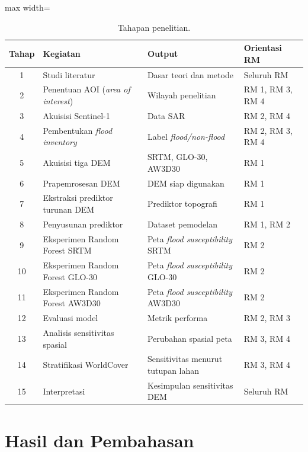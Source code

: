 \documentclass[12pt]{article}
\begin{document}
\begin{table}[ht]
\centering
\caption{Tahapan penelitian.}
\label{tab:tahapan}
\begin{adjustbox}{max width=\textwidth}
\begin{tabular}{clp{5.4cm}p{4.6cm}}
\toprule
\textbf{Tahap} & \textbf{Kegiatan} & \textbf{Output} & \textbf{Orientasi RM} \\
\midrule
1 & Studi literatur & Dasar teori dan metode & Seluruh RM \\
2 & Penentuan AOI (\textit{area of interest}) & Wilayah penelitian & RM 1, RM 3, RM 4 \\
3 & Akuisisi Sentinel-1 & Data SAR & RM 2, RM 4 \\
4 & Pembentukan \textit{flood inventory} & Label \textit{flood/non-flood} & RM 2, RM 3, RM 4 \\
5 & Akuisisi tiga DEM & SRTM, GLO-30, AW3D30 & RM 1 \\
6 & Prapemrosesan DEM & DEM siap digunakan & RM 1 \\
7 & Ekstraksi prediktor turunan DEM & Prediktor topografi & RM 1 \\
8 & Penyusunan prediktor & Dataset pemodelan & RM 1, RM 2 \\
9 & Eksperimen Random Forest SRTM & Peta \textit{flood susceptibility} SRTM & RM 2 \\
10 & Eksperimen Random Forest GLO-30 & Peta \textit{flood susceptibility} GLO-30 & RM 2 \\
11 & Eksperimen Random Forest AW3D30 & Peta \textit{flood susceptibility} AW3D30 & RM 2 \\
12 & Evaluasi model & Metrik performa & RM 2, RM 3 \\
13 & Analisis sensitivitas spasial & Perubahan spasial peta & RM 3, RM 4 \\
14 & Stratifikasi WorldCover & Sensitivitas menurut tutupan lahan & RM 3, RM 4 \\
15 & Interpretasi & Kesimpulan sensitivitas DEM & Seluruh RM \\
\bottomrule
\end{tabular}
\end{adjustbox}
\end{table}


\clearpage
\section{Hasil dan Pembahasan}
\end{document}
